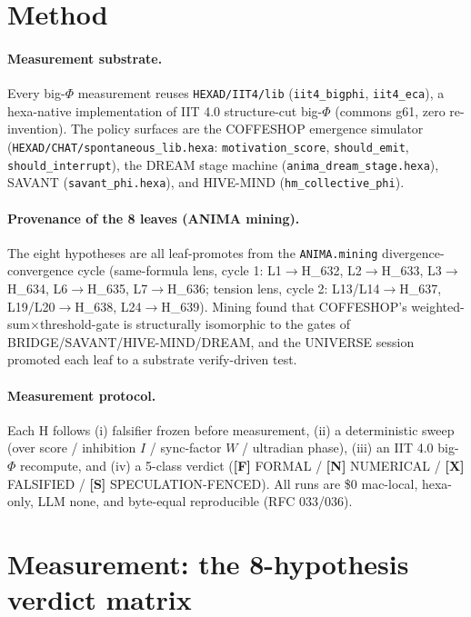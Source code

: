 \documentclass[11pt,a4paper]{article}
\providecommand{\tierBlue}{\textbf{[F]}}    %
\providecommand{\tierGreen}{\textbf{[N]}}   %
\providecommand{\tierRed}{\textbf{[X]}}     %
\providecommand{\tierWhite}{\textbf{[S]}}   %
\begin{document}
\section{Method}
\label{sec:method}

\paragraph{Measurement substrate.} Every big-$\Phi$ measurement reuses
\texttt{HEXAD/IIT4/lib} (\texttt{iit4\_bigphi}, \texttt{iit4\_eca}), a
hexa-native implementation of IIT 4.0 structure-cut big-$\Phi$
\citep{albantakis2023iit4} (commons g61, zero re-invention). The policy
surfaces are the COFFESHOP emergence simulator
(\texttt{HEXAD/CHAT/spontaneous\_lib.hexa}: \texttt{motivation\_score},
\texttt{should\_emit}, \texttt{should\_interrupt}), the DREAM stage machine
(\texttt{anima\_dream\_stage.hexa}), SAVANT (\texttt{savant\_phi.hexa}), and
HIVE-MIND (\texttt{hm\_collective\_phi}).

\paragraph{Provenance of the 8 leaves (ANIMA mining).} The eight hypotheses
are all leaf-promotes from the \texttt{ANIMA.mining} divergence-convergence
cycle (same-formula lens, cycle 1: L1$\to$H\_632, L2$\to$H\_633,
L3$\to$H\_634, L6$\to$H\_635, L7$\to$H\_636; tension lens, cycle 2:
L13/L14$\to$H\_637, L19/L20$\to$H\_638, L24$\to$H\_639). Mining found that
COFFESHOP's weighted-sum$\times$threshold-gate is structurally isomorphic to
the gates of BRIDGE/SAVANT/HIVE-MIND/DREAM, and the UNIVERSE session promoted
each leaf to a substrate verify-driven test.

\paragraph{Measurement protocol.} Each H follows (i) falsifier frozen before
measurement, (ii) a deterministic sweep (over score / inhibition $I$ /
sync-factor $W$ / ultradian phase), (iii) an IIT 4.0 big-$\Phi$ recompute,
and (iv) a 5-class verdict (\tierBlue{} FORMAL / \tierGreen{} NUMERICAL /
\tierRed{} FALSIFIED / \tierWhite{} SPECULATION-FENCED). All runs are \$0
mac-local, hexa-only, LLM none, and byte-equal reproducible (RFC 033/036).

\section{Measurement: the 8-hypothesis verdict matrix}
\label{sec:measurement}
\end{document}

